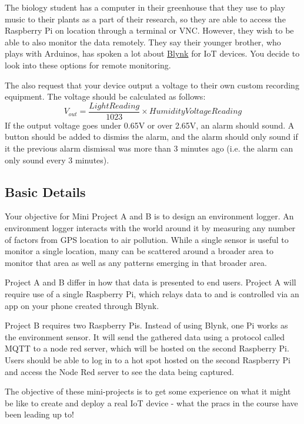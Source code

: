 The biology student has a computer in their greenhouse that they use to play music to their plants as a part of their research, so they are able to access the Raspberry Pi on location through a terminal or VNC. However, they wish to be able to also monitor the data remotely. They say their younger brother, who plays with Arduinos, has spoken a lot about \href{https://blynk.io/}{Blynk} for IoT devices. You decide to look into these options for remote monitoring. 

The also request that your device output a voltage to their own custom recording equipment. The voltage should be calculated as follows:
$$
V_{out} = \frac{Light Reading}{1023} \times Humidity Voltage Reading
$$
If the output voltage goes under 0.65V or over 2.65V, an alarm should sound. A button should be added to dismiss the alarm, and the alarm should only sound if it the previous alarm dismissal was more than 3 minutes ago (i.e. the alarm can only sound every 3 minutes).


\subsection{Basic Details}
Your objective for Mini Project A and B is to design an environment logger. An environment logger interacts with the world around it by measuring any number of factors from GPS location to air pollution. While a single sensor is useful to monitor a single location, many can be scattered around a broader area to monitor that area as well as any patterns emerging in that broader area.

Project A and B differ in how that data is presented to end users. Project A will require use of a single Raspberry Pi, which relays data to and is controlled via an app on your phone created through Blynk.

Project B requires two Raspberry Pis. Instead of using Blynk, one Pi works as the environment sensor. It will send the gathered data using a protocol called MQTT to a node red server, which will be hosted on the second Raspberry Pi. Users should be able to log in to a hot spot hosted on the second Raspberry Pi and access the Node Red server to see the data being captured.

The objective of these mini-projects is to get some experience on what it might be like to create and deploy a real IoT device - what the pracs in the course have been leading up to!






